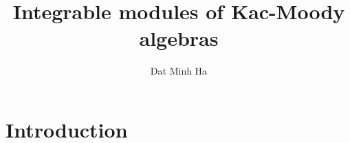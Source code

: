 

\setcounter{section}{-1}


\newcommand{\simpleroots}{\mathbb{I}}



    \title{Integrable modules of Kac-Moody algebras}
    
    \author{Dat Minh Ha}
    \maketitle
    
    \begin{abstract}
        
    \end{abstract}
    
    {
    \hypersetup{} 
    \tableofcontents %
    }

    \section{Introduction}

    

    
    
    \printbibliography

